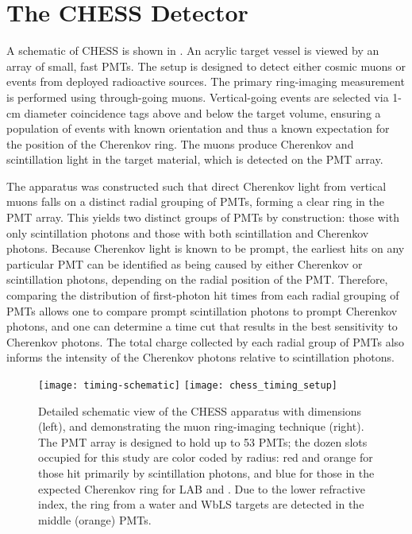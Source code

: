 \section{The CHESS Detector}\label{s:desc}

A schematic of CHESS is shown in .  
An acrylic target vessel is viewed by an array of small, fast PMTs. 
The setup is designed to detect either cosmic muons or events from deployed radioactive sources.  
The primary ring-imaging measurement is performed using through-going muons.  
Vertical-going events are selected via 1-cm diameter coincidence tags above and below the target volume, ensuring a population of events with known orientation and thus a known expectation for the position of the Cherenkov ring. 
The muons produce Cherenkov and scintillation light in the target material, which is detected on the PMT array. 

The apparatus was constructed such that direct Cherenkov light from vertical muons falls on a distinct radial grouping of PMTs, forming a clear ring in the PMT array.
This yields two distinct groups of PMTs by construction: those with only scintillation photons and those with both scintillation and Cherenkov photons. 
Because Cherenkov light is known to be prompt, the earliest hits on any particular PMT can be identified as being caused by either Cherenkov or scintillation photons, depending on the radial position of the PMT.
Therefore, comparing the distribution of first-photon hit times from each radial grouping of PMTs allows one to compare prompt scintillation photons to prompt Cherenkov photons, and one can determine a time cut that results in the best sensitivity to Cherenkov photons.
The total charge collected by each radial group of PMTs also informs the intensity of the Cherenkov photons relative to scintillation photons.

\begin{figure}
\centering
\texttt{[image: timing-schematic]}
\texttt{[image: chess\_timing\_setup]}
\caption{Detailed schematic view of the CHESS apparatus with dimensions (left), and demonstrating the muon ring-imaging technique (right). The PMT array is designed to hold up to 53 PMTs; the dozen slots occupied for this study are color coded by radius: red and orange for those hit primarily by scintillation photons, and blue for those in the expected Cherenkov ring for LAB and {\labppo}. Due to the lower refractive index, the ring from a water and WbLS targets are detected in the middle (orange) PMTs.}
\label{fig:timing-setup}
\end{figure}


